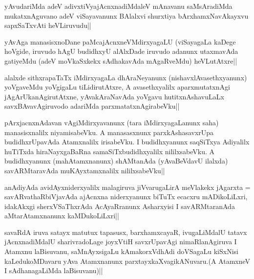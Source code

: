 \begin{artha}
yAvudariMda adeV adivxtiVyajAcnxnadiMdaleV mAnavanu saMsAradiMda mukatxnAguvano adeV viSayavanunx BAlalxvi shurxtiya bArxhamxNavAkayxvu sapxSaTxvAti heVLiruvudu||
\end{artha}


\begin{artha}
yAvAga manasisxnoDane paMcajAcnxneVMdirxyagaLU (viSayagaLa kaDege hoVgide, iruvudo hAgU budidhxyU alAlxDade iruvudo adanunx utaxmavAda gatiyeMdu (adeV moVkaSxkekx sAdhakavAda mAgaRveMdu) heVLutAtxre||
\end{artha}

\begin{artha}
alalxde sithxrapaTaTx iMdirxyagaLa dhAraNeyanunx (nishavxlAvasethxyanunx) yoVgaveMdu yoVgigaLu tiLidirutAtxre, A avasethxyalilx aparxmutatxnAgi jAgArUkanAgirutAtxne, yAvakAraNavAda yoVgavu hutitxnAshavuLaLx savxBAvavAgiruvodo adariMda parxmatatxnAgirabeVku||
\end{artha}

\begin{artha}
pArxjacnxnAdavan vAgiMdirxyavanunx (tara iMdirxyagaLanunx saha) manasisxnalilx niyamisabeVku. A manasasxnunx parxkAshasavxrUpa budidhxrUpavAda Atamxnalilx irisabeVku. I budidhxyanunx saqSiTxya Adiyalilx huTiTxda hiraNayxgaBaRna samaSiTxbudidhxyalilx nililxsabeVku. A budidhxyanunx (mahAtamxnanunx) shAMtanAda (yAvaBeVdavU ilalxda) savARMtaravAda muKAyxtamxnalilx nililxsabeVku||
\end{artha}


\begin{artha}
anAdiyAda avidAyxniderxyalilx malagiruva jiVvarugaLirA meVlakekx jAgarxta = savARvathaRbiVjavAda ajAcnxna niderxyanunx biTuTx ecacxru mADikoLiLxri, idakAkxgi sherxVSaThxrAda AcAyaRranunx Asharxyisi I savARMtaranAda aMtarAtamxnanunx kaMDukoLiLxri||
\end{artha}


\begin{artha}
savaRdA iruva satayx matutux tapasusx, barxhamxcayaR, ivugaLiMdalU tatavx jAcnxnadiMdalU sharivradoLage joyxVtiH savxrUpavAgi nimaRlanAgiruva I Atamxnu laBisuvanu, saMnAyxsigaLu kAmakorxVdhAdi doVSagaLu kiSxNisi kaLedukoMDavaru yAva Atamxnanunx parxtayxkaXvagikANuvaru.(A AtamxneV I sAdhanagaLiMda laBisuvanu)||
\end{artha}


